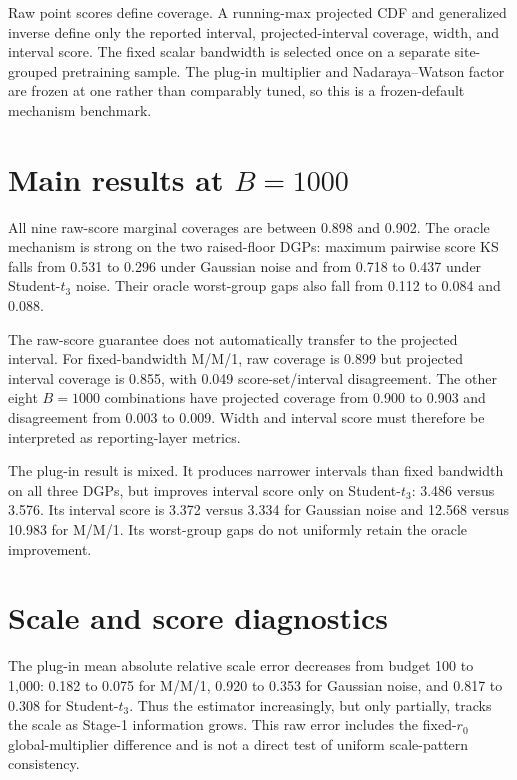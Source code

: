 \documentclass[11pt]{article}
\begin{document}
Raw point scores define coverage. A running-max projected CDF and generalized
inverse define only the reported interval, projected-interval coverage, width,
and interval score. The fixed scalar bandwidth is selected once on a separate
site-grouped pretraining sample. The plug-in multiplier and Nadaraya--Watson
factor are frozen at one rather than comparably tuned, so this is a
frozen-default mechanism benchmark.

\section{Main results at \texorpdfstring{\(B=1000\)}{B=1000}}



All nine raw-score marginal coverages are between 0.898 and 0.902. The oracle
mechanism is strong on the two raised-floor DGPs: maximum pairwise score KS
falls from 0.531 to 0.296 under Gaussian noise and from 0.718 to 0.437 under
Student-\(t_3\) noise. Their oracle worst-group gaps also fall from 0.112 to
0.084 and 0.088.

The raw-score guarantee does not automatically transfer to the projected
interval. For fixed-bandwidth M/M/1, raw coverage is 0.899 but projected
interval coverage is 0.855, with 0.049 score-set/interval disagreement. The
other eight \(B=1000\) combinations have projected coverage from 0.900 to
0.903 and disagreement from 0.003 to 0.009. Width and interval score must
therefore be interpreted as reporting-layer metrics.

The plug-in result is mixed. It produces narrower intervals than fixed
bandwidth on all three DGPs, but improves interval score only on
Student-\(t_3\): 3.486 versus 3.576. Its interval score is 3.372 versus 3.334
for Gaussian noise and 12.568 versus 10.983 for M/M/1. Its worst-group gaps do
not uniformly retain the oracle improvement.

\section{Scale and score diagnostics}

The plug-in mean absolute relative scale error decreases from budget 100 to
1,000: 0.182 to 0.075 for M/M/1, 0.920 to 0.353 for Gaussian noise, and 0.817
to 0.308 for Student-\(t_3\). Thus the estimator increasingly, but only
partially, tracks the scale as Stage-1 information grows. This raw error
includes the fixed-\(r_0\) global-multiplier difference and is not a direct
test of uniform scale-pattern consistency.
\end{document}
